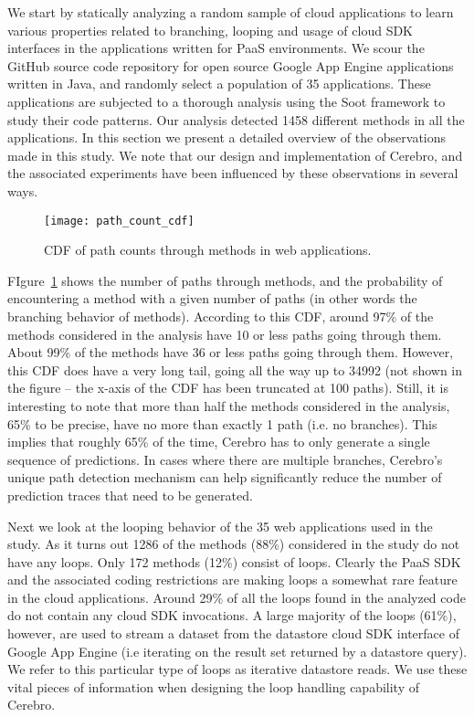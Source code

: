 We start by statically analyzing a random sample of cloud applications to learn various properties related
to branching, looping and usage of cloud SDK interfaces in the applications written for PaaS environments. 
We scour the GitHub source code repository for open source Google App Engine applications written in Java,
and randomly select a population of 35 applications. These applications are subjected to a thorough analysis
using the Soot framework to study their code patterns. Our analysis detected 1458 different methods in all the
applications. In this section we present a detailed overview of the observations made in this study. We note that
our design and implementation of Cerebro, and the associated experiments have been influenced by 
these observations in several ways.

\begin{figure}
\centering
\texttt{[image: path\_count\_cdf]}
\caption{CDF of path counts through methods in web applications.}
\label{fig:path_count_cdf}
\end{figure}

FIgure~\ref{fig:path_count_cdf} shows the number of paths through methods, and the probability of encountering
a method with a given number of paths (in other words the branching behavior of methods). According to this CDF, 
around 97\% of the methods considered in the analysis have 10 or less paths going through them. About 99\% of 
the methods have 36 or less paths going through them. However, this CDF does have a very long tail, going all the way
up to 34992 (not shown in the figure -- the x-axis of the CDF has been truncated at 100 paths). Still, it is interesting to note that more
than half the methods considered in the analysis, 65\% to be precise, have no more than exactly 1 path (i.e. no branches).
This implies that roughly 65\% of the time, Cerebro has to only generate a single sequence of predictions. In cases
where there are multiple branches, Cerebro's unique path detection mechanism can help significantly 
reduce the number of prediction traces that need to be generated.

Next we look at the looping behavior of the 35 web applications used in the study. As it turns out 1286 of the methods (88\%)
considered in the study
do not have any loops. Only 172 methods (12\%) consist of loops. Clearly the PaaS SDK and the associated coding restrictions
are making loops a somewhat rare feature in the cloud applications. Around 29\% of all the loops found in 
the analyzed code do not contain any cloud SDK invocations. 
A large majority of the loops (61\%), however, are
used to stream a dataset from the datastore cloud SDK interface of Google App Engine (i.e iterating on the result set 
returned by a datastore query). We refer to this particular type of loops as iterative datastore reads. 
We use these vital pieces of information when designing the loop handling capability of
Cerebro.

